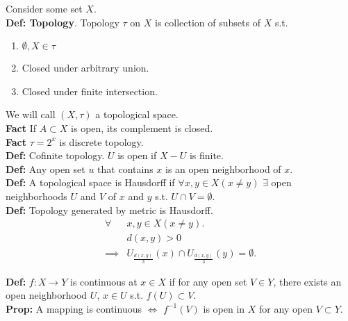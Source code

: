 \documentclass[a4paper]{article}
\begin{document}
Consider some set $X$.\\

\textbf{Def: Topology}. Topology $\tau$ on $X$ is collection of subsets of $X$ s.t.
\begin{enumerate}
	\item  $\emptyset, X \in \tau$ 
	\item Closed under arbitrary union.
	\item Closed under finite intersection.
\end{enumerate}

We will call $\left( X, \tau \right) $ a topological space.\\

\textbf{Fact} If $A \subset X$ is open, its complement is closed.\\

\textbf{Fact} $\tau = 2^{x}$ is discrete topology.\\

\textbf{Def:} Cofinite topology. $U$ is open if $X - U  $ is finite.\\ 

\textbf{Def:} Any open set $u$ that contains $x$ is an open neighborhood of $x$.\\

\textbf{Def:} A topological space is Hausdorff if $\forall x, y \in X (x \neq y) $ $\exists $ open neighborhoods $U$ and $V$ of $x$ and $y$ s.t. $U \cap V = \emptyset.$\\

\textbf{Def:} Topology generated by metric is Hausdorff.
\begin{align*}
	\forall &x,y \in X (x\neq y).\\
		&d(x,y) > 0\\
	\implies &U_{\frac{d(x,y)}{3}} (x) \cap U_{\frac{d(x,y)}{3}} (y) = \emptyset.
\end{align*}

\textbf{Def:}  $f:X \to Y$ is continuous at $x \in X$ if for any open set $V \in Y$, there exists an open neighborhood $U$, $x \in U$ s.t. $f(U) \subset V$.\\

\textbf{Prop:} A mapping is continuous $\iff$ $f^{-1}(V)$ is open in $X$ for any open $V \subset Y$.\\
\end{document}
